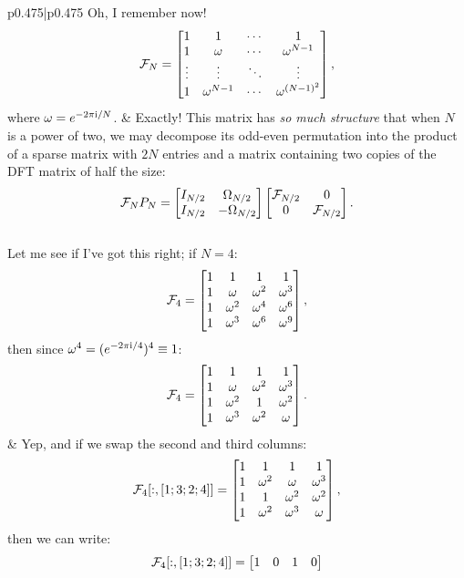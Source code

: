 \documentclass[11pt,letterpaper]{article}
\begin{document}
\begin{longtable}{p{}|p{}}
\hline
Oh, I remember now!
\[
\mathcal{F}_N = \begin{bmatrix}
1 & 1 & \cdots & 1\\
1 & \omega & \cdots & \omega^{N-1}\\
\vdots & \vdots & \ddots & \vdots\\
1 & \omega^{N-1} & \cdots & \omega^{(N-1)^2}
\end{bmatrix},
\]
where $\omega = e^{-2\pi{\rm i}/N}$. & Exactly! This matrix has {\em so much structure} that when $N$ is a power of two, we may decompose its odd-even permutation into the product of a sparse matrix with $2N$ entries and a matrix containing two copies of the DFT matrix of half the size:
\[
\mathcal{F}_NP_N = \begin{bmatrix}
I_{N/2} & \Omega_{N/2}\\
I_{N/2} & -\Omega_{N/2}\\
\end{bmatrix}
\begin{bmatrix}
\mathcal{F}_{N/2} & 0\\
0 & \mathcal{F}_{N/2}\\
\end{bmatrix}.
\]\\
\hline
Let me see if I've got this right; if $N=4$:
\[
\mathcal{F}_4 = \begin{bmatrix}
1 & 1 & 1 & 1\\
1 & \omega & \omega^2 & \omega^3\\
1 & \omega^2 & \omega^4 & \omega^6\\
1 & \omega^3 & \omega^6 & \omega^9
\end{bmatrix},
\]
then since $\omega^4 = (e^{-2\pi{\rm i}/4})^4\equiv1$:
\[
\mathcal{F}_4 = \begin{bmatrix}
1 & 1 & 1 & 1\\
1 & \omega & \omega^2 & \omega^3\\
1 & \omega^2 & 1 & \omega^2\\
1 & \omega^3 & \omega^2 & \omega
\end{bmatrix}.
\]
& Yep, and if we swap the second and third columns:
\[
\mathcal{F}_4[:,[1;3;2;4]] = \begin{bmatrix}
1 & 1 & 1 & 1\\
1 & \omega^2 & \omega & \omega^3\\
1 & 1 & \omega^2 & \omega^2\\
1 & \omega^2 & \omega^3 & \omega
\end{bmatrix},
\]
then we can write:
\[
\mathcal{F}_4[:,[1;3;2;4]] = \begin{bmatrix}
1 & 0 & 1 & 0\\

\end{bmatrix}\]
\end{longtable}
\end{document}
